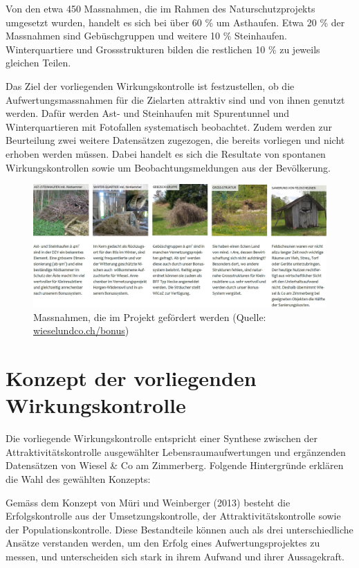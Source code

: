 \documentclass[
  oneside]{scrbook}
\begin{document}
Von den etwa 450 Massnahmen, die im Rahmen des Naturschutzprojekts umgesetzt wurden, handelt es sich bei über 60 \% um Asthaufen. Etwa 20 \% der Massnahmen sind Gebüschgruppen und weitere 10 \% Steinhaufen. Winterquartiere und Grossstrukturen bilden die restlichen 10 \% zu jeweils gleichen Teilen.

Das Ziel der vorliegenden Wirkungskontrolle ist festzustellen, ob die Aufwertungsmassnahmen für die Zielarten attraktiv sind und von ihnen genutzt werden. Dafür werden Ast- und Steinhaufen mit Spurentunnel und Winterquartieren mit Fotofallen systematisch beobachtet. Zudem werden zur Beurteilung zwei weitere Datensätzen zugezogen, die bereits vorliegen und nicht erhoben werden müssen. Dabei handelt es sich die Resultate von spontanen Wirkungskontrollen sowie um Beobachtungsmeldungen aus der Bevölkerung.



\begin{figure}[H]
\includegraphics[width=1\linewidth]{images/massnahmen} \caption{Massnahmen, die im Projekt gefördert werden (Quelle: \href{http://www.wieselundco.ch/bonus}{wieselundco.ch/bonus})}\label{fig:massnahmen}
\end{figure}

\hypertarget{konzept-der-vorliegenden-wirkungskontrolle}{%
\chapter{Konzept der vorliegenden Wirkungskontrolle}\label{konzept-der-vorliegenden-wirkungskontrolle}}

Die vorliegende Wirkungskontrolle entspricht einer Synthese zwischen der Attraktivitätskontrolle ausgewählter Lebensraumaufwertungen und ergänzenden Datensätzen von Wiesel \& Co am Zimmerberg. Folgende Hintergründe erklären die Wahl des gewählten Konzepts:

Gemäss dem Konzept von Müri und Weinberger (2013) besteht die Erfolgskontrolle aus der Umsetzungskontrolle, der Attraktivitätskontrolle sowie der Populationskontrolle. Diese Bestandteile können auch als drei unterschiedliche Ansätze verstanden werden, um den Erfolg eines Aufwertungsprojektes zu messen, und unterscheiden sich stark in ihrem Aufwand und ihrer Aussagekraft.
\end{document}
